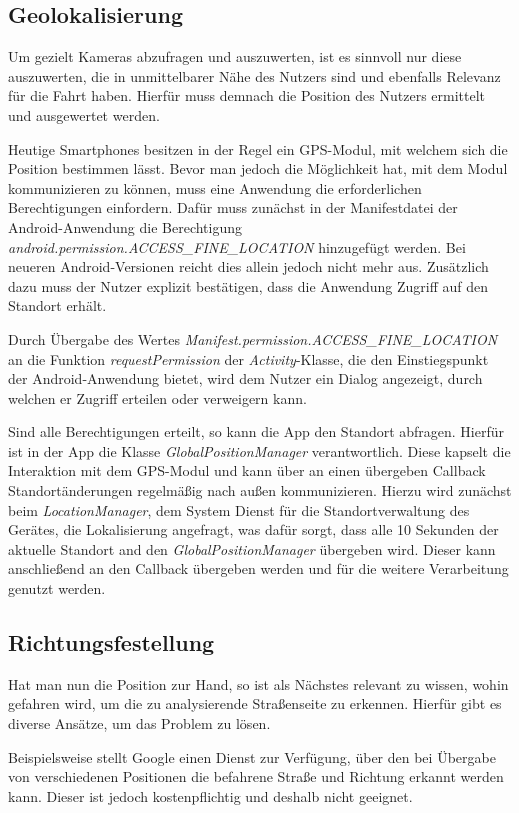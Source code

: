 \subsection{Geolokalisierung}
Um gezielt Kameras abzufragen und auszuwerten, ist es sinnvoll nur diese auszuwerten, die in unmittelbarer Nähe des Nutzers sind und ebenfalls Relevanz für die Fahrt haben. Hierfür muss demnach die Position des Nutzers ermittelt und ausgewertet werden.

Heutige Smartphones besitzen in der Regel ein GPS-Modul, mit welchem sich die Position bestimmen lässt.
Bevor man jedoch die Möglichkeit hat, mit dem Modul kommunizieren zu können, muss eine Anwendung die erforderlichen Berechtigungen einfordern.
Dafür muss zunächst in der Manifestdatei der Android-Anwendung die Berechtigung {\em android.permission.ACCESS\_FINE\_LOCATION} hinzugefügt werden.
Bei neueren Android-Versionen reicht dies allein jedoch nicht mehr aus. Zusätzlich dazu muss der Nutzer explizit bestätigen, dass die Anwendung Zugriff auf den Standort erhält.

Durch Übergabe des Wertes {\em Manifest.permission.ACCESS\_FINE\_LOCATION} an die Funktion {\em requestPermission} der {\em Activity}-Klasse, die den Einstiegspunkt der Android-Anwendung bietet, wird dem Nutzer ein Dialog angezeigt, durch welchen er Zugriff erteilen oder verweigern kann.


Sind alle Berechtigungen erteilt, so kann die App den Standort abfragen.
Hierfür ist in der App die Klasse {\em GlobalPositionManager} verantwortlich. Diese kapselt die Interaktion mit dem GPS-Modul und kann über an einen übergeben Callback Standortänderungen regelmäßig nach außen kommunizieren.
Hierzu wird zunächst beim {\em LocationManager}, dem System Dienst für die Standortverwaltung des Gerätes, die Lokalisierung angefragt, was dafür sorgt, dass alle 10 Sekunden der aktuelle Standort and den {\em GlobalPositionManager} übergeben wird. Dieser kann anschließend an den Callback übergeben werden und für die weitere Verarbeitung genutzt werden.

\subsection{Richtungsfestellung}
Hat man nun die Position zur Hand, so ist als Nächstes relevant zu wissen, wohin gefahren wird, um die zu analysierende Straßenseite zu erkennen.
Hierfür gibt es diverse Ansätze, um das Problem zu lösen.

Beispielsweise stellt Google einen Dienst zur Verfügung, über den bei Übergabe von verschiedenen Positionen die befahrene Straße und Richtung erkannt werden kann. Dieser ist jedoch kostenpflichtig und deshalb nicht geeignet.


